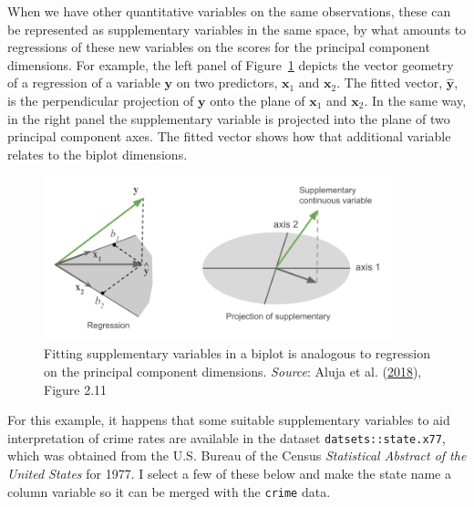 \documentclass[
  letterpaper,
  10pt,
  krantz2]{krantz}
\begin{document}
When we have other quantitative variables on the same observations,
these can be represented as supplementary variables in the same space,
by what amounts to regressions of these new variables on the scores for
the principal component dimensions. For example, the left panel of
Figure~\ref{fig-supp-regession} depicts the vector geometry of a
regression of a variable \(\mathbf{y}\) on two predictors,
\(\mathbf{x}_1\) and \(\mathbf{x}_2\). The fitted vector,
\(\widehat{\mathbf{y}}\), is the perpendicular projection of
\(\mathbf{y}\) onto the plane of \(\mathbf{x}_1\) and \(\mathbf{x}_2\).
In the same way, in the right panel the supplementary variable is
projected into the plane of two principal component axes. The fitted
vector shows how that additional variable relates to the biplot
dimensions.

\begin{figure}

{\centering \includegraphics[width=0.9\textwidth,height=\textheight]{images/pca4ds-figure-2-11.png}

}

\caption{\label{fig-supp-regession}Fitting supplementary variables in a
biplot is analogous to regression on the principal component dimensions.
\emph{Source}: Aluja et al.
(\protect\hyperlink{ref-Aluja-etal-2018}{2018}), Figure 2.11}

\end{figure}

For this example, it happens that some suitable supplementary variables
to aid interpretation of crime rates are available in the dataset
\texttt{datsets::state.x77}, which was obtained from the U.S. Bureau of
the Census \emph{Statistical Abstract of the United States} for 1977. I
select a few of these below and make the state name a column variable so
it can be merged with the \texttt{crime} data.
\end{document}
